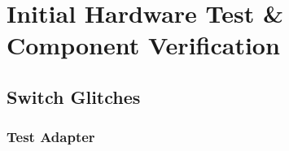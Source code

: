 \chapter{Initial Hardware Test \& Component Verification}\label{sec:eval}

\section{Switch Glitches}\label{sec:switchGlitch}
\subsection{Test Adapter}\label{sec:testAdapter}
